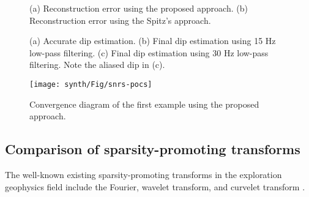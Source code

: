 \begin{figure}[htb!]
  \centering
	\caption{(a) Reconstruction error using the proposed approach. (b) Reconstruction error using the Spitz's approach.}
   \label{fig:hyper-seis-dif,hyper-fx-dif}
\end{figure}


\begin{figure}[htb!]
  \centering
	\caption{(a) Accurate dip estimation. (b) Final dip estimation using 15 Hz low-pass filtering. (c) Final dip estimation using 30 Hz low-pass filtering. Note the aliased dip in (c).}
   \label{fig:dip,dip1,dip2}
\end{figure}

\begin{figure}[htb!]
  \centering
    \texttt{[image: synth/Fig/snrs-pocs]}
	\caption{Convergence diagram of the first example using the proposed approach.}
   \label{fig:snrs-pocs}
\end{figure}

\subsection{Comparison of sparsity-promoting transforms}
The well-known existing sparsity-promoting transforms in the exploration geophysics field include the Fourier\cite{chandrasekharan1949}, wavelet transform\cite{akansu2010}, and curvelet transform \cite{candes20061}. 

